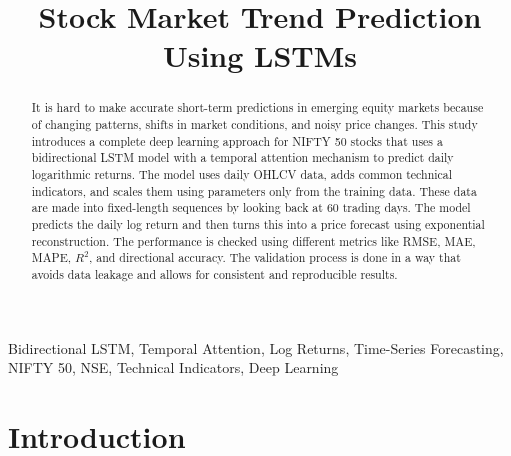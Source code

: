 \documentclass[conference]{IEEEtran}
\begin{document}
\title{Stock Market Trend Prediction Using LSTMs}

\author{
}

\maketitle

\begin{abstract}
It is hard to make accurate short-term predictions in emerging equity markets because of changing patterns, shifts in market conditions, and noisy price changes. This study introduces a complete deep learning approach for NIFTY 50 stocks that uses a bidirectional LSTM model with a temporal attention mechanism to predict daily logarithmic returns. The model uses daily OHLCV data, adds common technical indicators, and scales them using parameters only from the training data. These data are made into fixed-length sequences by looking back at 60 trading days. The model predicts the daily log return and then turns this into a price forecast using exponential reconstruction. The performance is checked using different metrics like RMSE, MAE, MAPE, $R^2$, and directional accuracy. The validation process is done in a way that avoids data leakage and allows for consistent and reproducible results.
\end{abstract}

\begin{IEEEkeywords}
Bidirectional LSTM, Temporal Attention, Log Returns, Time-Series Forecasting, NIFTY 50, NSE, Technical Indicators, Deep Learning
\end{IEEEkeywords}

\section{Introduction}
\end{document}
